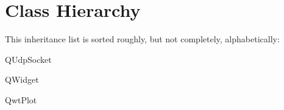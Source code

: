 \section{Class Hierarchy}
This inheritance list is sorted roughly, but not completely, alphabetically\-:\begin{DoxyCompactList}
\item Q\-Udp\-Socket\begin{DoxyCompactList}
\item {}
\end{DoxyCompactList}
\item Q\-Widget\begin{DoxyCompactList}
\item {}
\end{DoxyCompactList}
\item Qwt\-Plot\begin{DoxyCompactList}
\item {}
\end{DoxyCompactList}
\end{DoxyCompactList}
